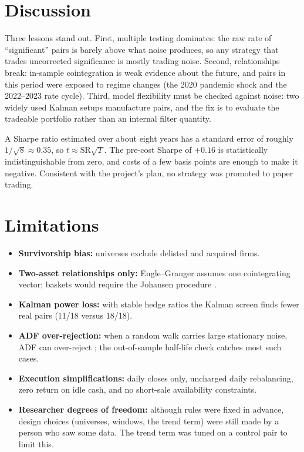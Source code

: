 \documentclass[11pt]{article}
\begin{document}
\section{Discussion}

Three lessons stand out. First, multiple testing dominates: the raw rate of ``significant''
pairs is barely above what noise produces, so any strategy that trades uncorrected
significance is mostly trading noise. Second, relationships break: in-sample cointegration
is weak evidence about the future, and pairs in this period were exposed to regime changes
(the 2020 pandemic shock and the 2022--2023 rate cycle). Third, model flexibility must be
checked against noise: two widely used Kalman setups manufacture pairs, and the fix is to
evaluate the tradeable portfolio rather than an internal filter quantity.

A Sharpe ratio estimated over about eight years has a standard error of roughly
$1/\sqrt{8}\approx0.35$, so $t\approx \text{SR}\sqrt{T}$. The pre-cost Sharpe of $+0.16$ is
statistically indistinguishable from zero, and costs of a few basis points are enough to make
it negative. Consistent with the project's plan, no strategy was promoted to paper trading.

\section{Limitations}

\begin{itemize}
  \item \textbf{Survivorship bias:} universes exclude delisted and acquired firms.
  \item \textbf{Two-asset relationships only:} Engle--Granger assumes one cointegrating vector;
        baskets would require the Johansen procedure \citep{johansen1988}.
  \item \textbf{Kalman power loss:} with stable hedge ratios the Kalman screen finds fewer real
        pairs (11/18 versus 18/18).
  \item \textbf{ADF over-rejection:} when a random walk carries large stationary noise,
        ADF can over-reject \citep{schwert1989}; the out-of-sample half-life check catches most
        such cases.
  \item \textbf{Execution simplifications:} daily closes only, uncharged daily rebalancing,
        zero return on idle cash, and no short-sale availability constraints.
  \item \textbf{Researcher degrees of freedom:} although rules were fixed in advance, design
        choices (universes, windows, the trend term) were still made by a person who saw some
        data. The trend term was tuned on a control pair to limit this.
\end{itemize}
\end{document}
